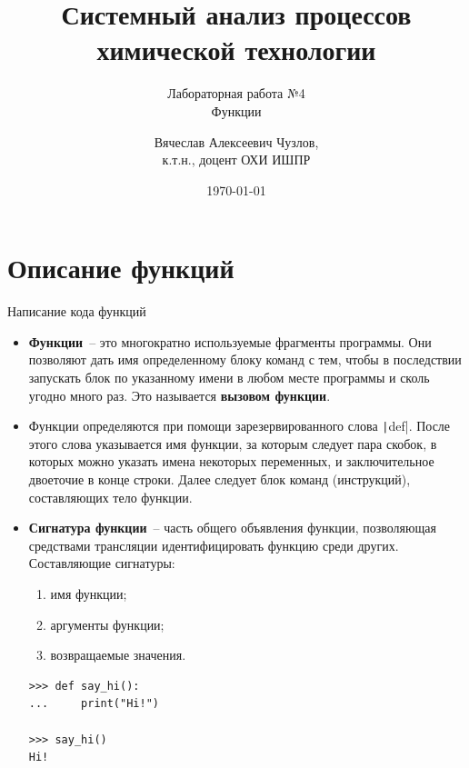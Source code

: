 \documentclass[aspectratio=169, mathserif]{beamer}%
\title{\LARGE{Системный анализ процессов химической технологии}}
\subtitle{Лабораторная работа №4 \\ Функции}
\author[]{Вячеслав Алексеевич Чузлов, \\
к.т.н., доцент ОХИ ИШПР}
\date{\today}
\begin{document}
\newcommand{\pythoninline}[1]{%
	\colorbox{white}{%
		\parbox[b][.6em]{\widthof{\texttt{#1}}}{\texttt{#1}}%
	}%
}


\titleframe%




\section{Описание функций}
\sectionframe


\begin{frame}[fragile]{Написание кода функций}
\scriptsize
\begin{itemize}
\item \textcolor{extraorange}{\textbf{Функции}}~-- это многократно используемые фрагменты программы. Они позволяют дать имя определенному блоку команд с тем, чтобы в последствии запускать блок по указанному имени в любом месте программы и сколь угодно много раз. Это называется \textbf{вызовом функции}.
\item Функции определяются при помощи зарезервированного слова \texttt|def|. После этого слова указывается имя функции, за которым следует пара скобок, в которых можно указать имена некоторых переменных, и заключительное двоеточие в конце строки. Далее следует блок команд (инструкций), составляющих тело функции.

\item \textcolor{extraorange}{\textbf{Сигнатура функции}}~-- часть общего объявления функции, позволяющая средствами трансляции идентифицировать функцию среди других. Составляющие сигнатуры:
\begin{enumerate}
\scriptsize
\item имя функции;
\item аргументы функции;
\item возвращаемые значения.
\end{enumerate} 

\begin{verbatim}
>>> def say_hi():
...     print("Hi!")       

>>> say_hi()
Hi!
\end{verbatim}

\end{itemize}
\vfill
\end{frame}
\end{document}
